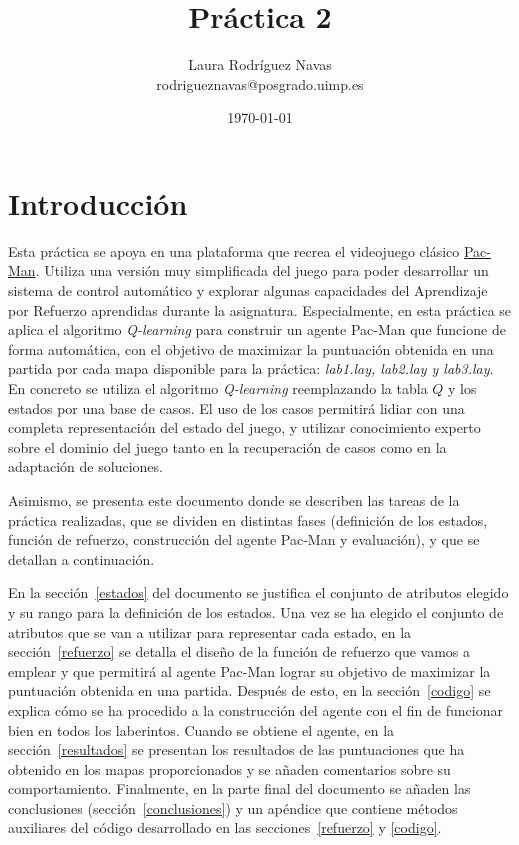 \documentclass[11pt]{exam}
\title{Práctica 2}
\author{Laura Rodríguez Navas \\ rodrigueznavas@posgrado.uimp.es}
\date{{\selectlanguage{spanish}\today} }
\begin{document}
	
\maketitle

\renewcommand{\tablename}{Tabla}
\renewcommand{\lstlistingname}{Código}

\section{Introducción}\label{introduccion}

Esta práctica se apoya en una plataforma que recrea el videojuego clásico \href{1https://en.wikipedia.org/wiki/Pac-Man}{Pac-Man}. Utiliza una versión muy simplificada del juego para poder desarrollar un sistema de control automático y explorar algunas capacidades del Aprendizaje por Refuerzo aprendidas durante la asignatura. Especialmente, en esta práctica se aplica el algoritmo \textit{Q-learning} para construir un agente Pac-Man que funcione de forma automática, con el objetivo de maximizar la puntuación obtenida en una partida por cada mapa disponible para la práctica: \textit{lab1.lay, lab2.lay y lab3.lay}. En concreto se utiliza el algoritmo \textit{Q-learning} reemplazando la tabla $Q$ y los estados por una base de casos. El uso de los casos permitirá lidiar con una completa representación del estado del juego, y utilizar conocimiento experto sobre el dominio del juego tanto en la recuperación de casos como en la adaptación de soluciones.  
\vspace*{2mm}

Asimismo, se presenta este documento donde se describen las tareas de la práctica realizadas, que se dividen en distintas fases (definición de los estados, función de refuerzo, construcción del agente Pac-Man y evaluación), y que se detallan a continuación.
\vspace*{2mm}

En la sección~\ref{estados} del documento se justifica el conjunto de atributos elegido y su rango para la definición de los estados. Una vez se ha elegido el conjunto de atributos que se van a utilizar para representar cada estado, en la sección~\ref{refuerzo} se detalla el diseño de la función de refuerzo que vamos a emplear y que permitirá al agente Pac-Man lograr su objetivo de maximizar la puntuación obtenida en una partida. Después de esto, en la sección~\ref{codigo} se explica cómo se ha procedido a la construcción del agente con el fin de funcionar bien en todos los laberintos. Cuando se obtiene el agente, en la sección~\ref{resultados} se presentan los resultados de las puntuaciones que ha obtenido en los mapas proporcionados y se añaden comentarios sobre su comportamiento. Finalmente, en la parte final del documento se añaden las conclusiones (sección~\ref{conclusiones}) y un apéndice que contiene métodos auxiliares del código desarrollado en las secciones~\ref{refuerzo} y \ref{codigo}.
\vspace*{2mm}
\end{document}
